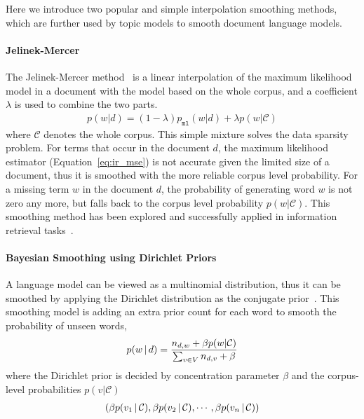 Here we introduce two popular and simple interpolation smoothing
methods, which are further used by topic models to smooth document
language models.

\paragraph{Jelinek-Mercer}

The Jelinek-Mercer method~\citep{Jelinek-1980} is a linear
interpolation of the maximum likelihood model in a document with the
model based on the whole corpus, and a coefficient $\lambda$ is used
to combine the two parts.
\begin{align}
p(w|d) = (1 - \lambda) p_{\texttt{ml}}(w|d) + \lambda p(w|\mathcal{C})
\label{eq:lm-jr}
\end{align}
where $\mathcal{C}$ denotes the whole corpus. This simple mixture
solves the data sparsity problem. For terms that occur in the document
$d$, the maximum likelihood estimator (Equation~\ref{eq:ir_mse}) is
not accurate given the limited size of a document, thus it is smoothed
with the more reliable corpus level probability. For a missing term
$w$ in the document $d$, the probability of generating word $w$ is not
zero any more, but falls back to the corpus level probability
$p(w|\mathcal{C})$.  This smoothing method has been explored and
successfully applied in information retrieval
tasks~\citep{PonteCroft,song-99}.

\paragraph{Bayesian Smoothing using Dirichlet Priors}

A language model can be viewed as a multinomial distribution, thus it
can be smoothed by applying the Dirichlet distribution as the
conjugate prior~\citep{mackay95dirichlet}. This smoothing model is
adding an extra prior count for each word to smooth the probability of
unseen words,
\begin{align}
p(w \, | \, d) = \frac{n_{d,w} + \beta p(w|\mathcal{C})}{\sum_{v \in V} n_{d,v} + \beta}
\end{align}
where the Dirichlet prior is decided by concentration parameter $\beta$ and the
corpus-level probabilities $p(v|\mathcal{C})$
\begin{align}
(\beta p(v_1 \, | \, \mathcal{C}), \beta p(v_2 \, | \, \mathcal{C}), \cdots, \beta p(v_n \, | \, \mathcal{C}))
\label{eq:lm-bs}
\end{align}

